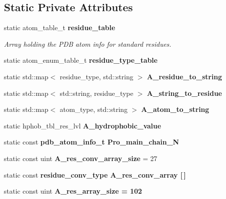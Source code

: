 \subsection*{Static Private Attributes}
\begin{CompactItemize}
\item 
static atom\_\-table\_\-t \bf{residue\_\-table}\label{classASCbase_1_1PDB__residues_9a981fa9a9bd789110356942cfc403fe}

\begin{CompactList}\small\item\em Array holding the PDB atom info for standard residues. \item\end{CompactList}\item 
static atom\_\-enum\_\-table\_\-t \textbf{residue\_\-type\_\-table}\label{classASCbase_1_1PDB__residues_907ae9bfd49fdee76097eaa56d98b966}

\item 
static std::map$<$ residue\_\-type, std::string $>$ \textbf{A\_\-residue\_\-to\_\-string}\label{classASCbase_1_1PDB__residues_510e2d05ca2e160c6a06bdb72bc2609b}

\item 
static std::map$<$ std::string, residue\_\-type $>$ \textbf{A\_\-string\_\-to\_\-residue}\label{classASCbase_1_1PDB__residues_f9b818f81d1f59b9fdc4fa1265962f0b}

\item 
static std::map$<$ atom\_\-type, std::string $>$ \textbf{A\_\-atom\_\-to\_\-string}\label{classASCbase_1_1PDB__residues_b9ba65f4ec6b2908873dfed2a4894b71}

\item 
static hphob\_\-tbl\_\-res\_\-lvl \textbf{A\_\-hydrophobic\_\-value}\label{classASCbase_1_1PDB__residues_46f19f926c02ebd43964b49dcc94e096}

\item 
static const \bf{pdb\_\-atom\_\-info\_\-t} \textbf{Pro\_\-main\_\-chain\_\-N}
\item 
static const uint \textbf{A\_\-res\_\-conv\_\-array\_\-size} = 27\label{classASCbase_1_1PDB__residues_0902c72733b48df0d225a27d2f5b9bbb}

\item 
static const \bf{residue\_\-conv\_\-type} \textbf{A\_\-res\_\-conv\_\-array} [$\,$]\label{classASCbase_1_1PDB__residues_f83894746507999835fd03709cb7cb09}

\item 
static const uint \bf{A\_\-res\_\-array\_\-size} = 102\label{classASCbase_1_1PDB__residues_30b9f32457869af112beb27bee963c4d}


\end{CompactItemize}
